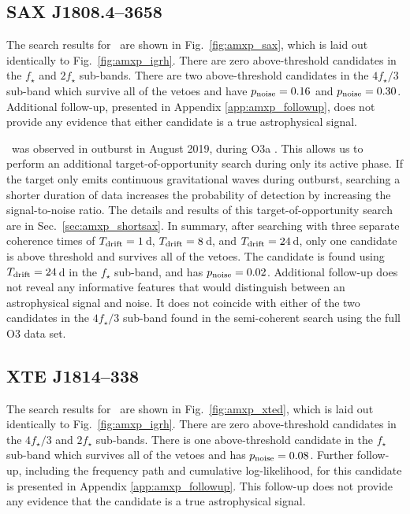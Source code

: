 \subsection{SAX J1808.4--3658   \label{sec:amxp_sax} }
The search results for \sax\ are shown in Fig.~\ref{fig:amxp_sax}, which is laid out identically to Fig.~\ref{fig:amxp_igrh}. There are zero above-threshold candidates in the $f_\star$ and $2f_\star$ sub-bands. There are two above-threshold candidates in the $4f_\star / 3$ sub-band which survive all of the vetoes and have $p_{\rm noise}=0.16$ and $p_{\rm noise}=0.30$. Additional follow-up, presented in Appendix \ref{app:amxp_followup}, does not provide any evidence that either candidate is a true astrophysical signal.

\sax\ was observed in outburst in August 2019, during O3a \cite{Bult2020, Goodwin2020}. This allows us to perform an additional target-of-opportunity search during only its active phase. If the target only emits continuous gravitational waves during outburst, searching a shorter duration of data increases the probability of detection by increasing the signal-to-noise ratio. The details and results of this target-of-opportunity search are in Sec.~\ref{sec:amxp_shortsax}. In summary, after searching with three separate coherence times of $T_{\textrm{drift}} = 1\,$d, $T_{\textrm{drift}}=8\,$d, and $T_{\textrm{drift}}=24\,$d, only one candidate is above threshold and survives all of the vetoes. The candidate is found using $T_{\textrm{drift}}=24\,$d in the $f_\star$ sub-band, and has $p_{\rm noise} = 0.02$. Additional follow-up does not reveal any informative features that would distinguish between an astrophysical signal and noise. It does not coincide with either of the two candidates in the $4f_\star / 3$ sub-band found in the semi-coherent search using the full O3 data set. 

\subsection{XTE J1814--338  \label{sec:amxp_xted} }
The search results for \xted\ are shown in Fig.~\ref{fig:amxp_xted}, which is laid out identically to Fig.~\ref{fig:amxp_igrh}. There are zero above-threshold candidates in the $4f_\star / 3$ and $2f_\star$ sub-bands. There is one above-threshold candidate in the $f_\star$ sub-band which survives all of the vetoes and has $p_{\rm noise}=0.08$.  Further follow-up, including the frequency path and cumulative log-likelihood, for this candidate is presented in Appendix \ref{app:amxp_followup}. This follow-up does not provide any evidence that the candidate is a true astrophysical signal.

